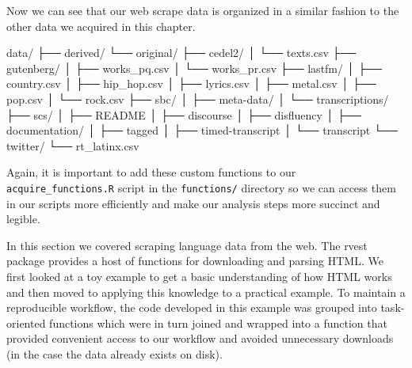 \documentclass[
]{article}
\newenvironment{Shaded}{\begin{snugshade}}{\end{snugshade}}
\newcommand{\ExtensionTok}[1]{#1}
\newcommand{\NormalTok}[1]{#1}
\begin{document}
Now we can see that our web scrape data is organized in a similar fashion to the other data we acquired in this chapter.

\begin{Shaded}
\begin{Highlighting}[]
\ExtensionTok{data/}
\ExtensionTok{├──}\NormalTok{ derived/}
\ExtensionTok{└──}\NormalTok{ original/}
    \ExtensionTok{├──}\NormalTok{ cedel2/}
    \ExtensionTok{│}\NormalTok{   └── texts.csv}
    \ExtensionTok{├──}\NormalTok{ gutenberg/}
    \ExtensionTok{│}\NormalTok{   ├── works\_pq.csv}
    \ExtensionTok{│}\NormalTok{   └── works\_pr.csv}
    \ExtensionTok{├──}\NormalTok{ lastfm/}
    \ExtensionTok{│}\NormalTok{   ├── country.csv}
    \ExtensionTok{│}\NormalTok{   ├── hip\_hop.csv}
    \ExtensionTok{│}\NormalTok{   ├── lyrics.csv}
    \ExtensionTok{│}\NormalTok{   ├── metal.csv}
    \ExtensionTok{│}\NormalTok{   ├── pop.csv}
    \ExtensionTok{│}\NormalTok{   └── rock.csv}
    \ExtensionTok{├──}\NormalTok{ sbc/}
    \ExtensionTok{│}\NormalTok{   ├── meta{-}data/}
    \ExtensionTok{│}\NormalTok{   └── transcriptions/}
    \ExtensionTok{├──}\NormalTok{ scs/}
    \ExtensionTok{│}\NormalTok{   ├── README}
    \ExtensionTok{│}\NormalTok{   ├── discourse}
    \ExtensionTok{│}\NormalTok{   ├── disfluency}
    \ExtensionTok{│}\NormalTok{   ├── documentation/}
    \ExtensionTok{│}\NormalTok{   ├── tagged}
    \ExtensionTok{│}\NormalTok{   ├── timed{-}transcript}
    \ExtensionTok{│}\NormalTok{   └── transcript}
    \ExtensionTok{└──}\NormalTok{ twitter/}
        \ExtensionTok{└──}\NormalTok{ rt\_latinx.csv}
\end{Highlighting}
\end{Shaded}

Again, it is important to add these custom functions to our \texttt{acquire\_functions.R} script in the \texttt{functions/} directory so we can access them in our scripts more efficiently and make our analysis steps more succinct and legible.

In this section we covered scraping language data from the web. The rvest package provides a host of functions for downloading and parsing HTML. We first looked at a toy example to get a basic understanding of how HTML works and then moved to applying this knowledge to a practical example. To maintain a reproducible workflow, the code developed in this example was grouped into task-oriented functions which were in turn joined and wrapped into a function that provided convenient access to our workflow and avoided unnecessary downloads (in the case the data already exists on disk).
\end{document}
